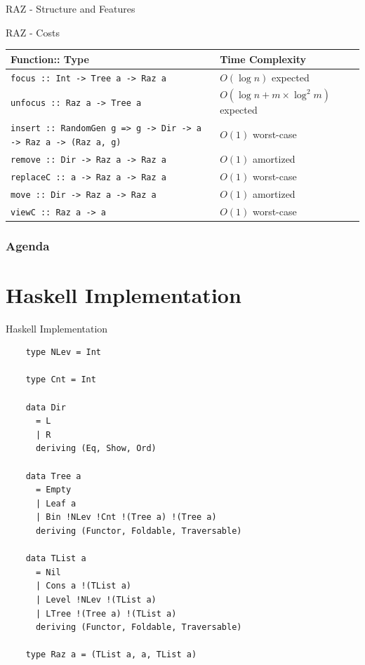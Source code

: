 \documentclass{beamer}
\begin{document}
\begin{frame}[fragile]{RAZ - Structure and Features}

  \begin{block}{RAZ - Costs}
    \begin{table}[H]
 \begin{tabular}{|l|l|}
  \hline
   Function:: Type & Time Complexity\\
  \hline
  \texttt{focus :: Int -> Tree a -> Raz a} & $O(\log{n})$ expected \\
  \texttt{unfocus :: Raz a -> Tree a} & $O(\log{n} + m \times \log^2{m})$ expected \\
  \hline
  \multicolumn{1}{|p{3cm}|}{\setlength{\rightskip}{0pt plus 1 fill}\texttt{insert :: RandomGen g => g -> Dir -> a -> Raz a -> (Raz a, g)}} & $O(1)$ worst-case \\
  \hline
  \texttt{remove :: Dir -> Raz a -> Raz a} & $O(1)$ amortized  \\
  \texttt{replaceC :: a -> Raz a -> Raz a} & $O(1)$ worst-case  \\
  \texttt{move :: Dir -> Raz a -> Raz a} & $O(1)$ amortized  \\
  \texttt{viewC :: Raz a -> a} & $O(1)$ worst-case  \\
  \hline
 \end{tabular}
\end{table}


  \end{block}

\end{frame}

\begin{frame}
  \frametitle{Agenda}
  \section{Haskell Implementation}
  \tableofcontents[currentsection]
\end{frame}

\begin{frame}[fragile]{Haskell Implementation}

  \begin{verbatim}
    type NLev = Int

    type Cnt = Int

    data Dir
      = L
      | R
      deriving (Eq, Show, Ord)

    data Tree a
      = Empty
      | Leaf a
      | Bin !NLev !Cnt !(Tree a) !(Tree a)
      deriving (Functor, Foldable, Traversable)

    data TList a
      = Nil
      | Cons a !(TList a)
      | Level !NLev !(TList a)
      | LTree !(Tree a) !(TList a)
      deriving (Functor, Foldable, Traversable)

    type Raz a = (TList a, a, TList a)
  \end{verbatim}

\end{frame}
\end{document}
